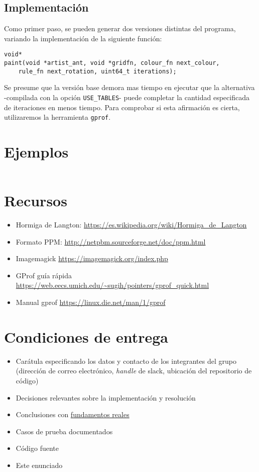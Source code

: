 \documentclass{article}
\begin{document}
\subsection{Implementación}

Como primer paso, se pueden generar dos versiones distintas del programa, variando la implementación de la siguiente
función:
\begin{small}
\begin{verbatim}
void*
paint(void *artist_ant, void *gridfn, colour_fn next_colour, 
    rule_fn next_rotation, uint64_t iterations);
\end{verbatim}
\end{small}

Se presume que la versión base demora mas tiempo en ejecutar que la alternativa -compilada con la opción 
\texttt{USE\_TABLES}- puede completar la cantidad especificada de iteraciones en menos tiempo.  Para comprobar si esta 
afirmación es cierta, utilizaremos la herramienta \texttt{gprof}.

\pagebreak
\section{Ejemplos}

\begin{verbatim}

\end{verbatim}
\section{Recursos}\label{Recursos}

\begin{itemize}
\item Hormiga de Langton: \url{https://es.wikipedia.org/wiki/Hormiga_de_Langton}
\item Formato PPM: \url{http://netpbm.sourceforge.net/doc/ppm.html}
\item Imagemagick \url{https://imagemagick.org/index.php}
\item GProf guía rápida \url{https://web.eecs.umich.edu/~sugih/pointers/gprof_quick.html}
\item Manual gprof \url{https://linux.die.net/man/1/gprof}

\end{itemize}

\section{Condiciones de entrega}

\begin{itemize}
\item Carátula especificando los datos y contacto de los integrantes del grupo (dirección de correo electrónico, 
\textit{handle} de slack, ubicación del repositorio de código)
\item Decisiones relevantes sobre la implementación y resolución
\item Conclusiones con \underline{fundamentos reales}
\item Casos de prueba documentados
\item Código fuente
\item Este enunciado
\end{itemize}
\end{document}
